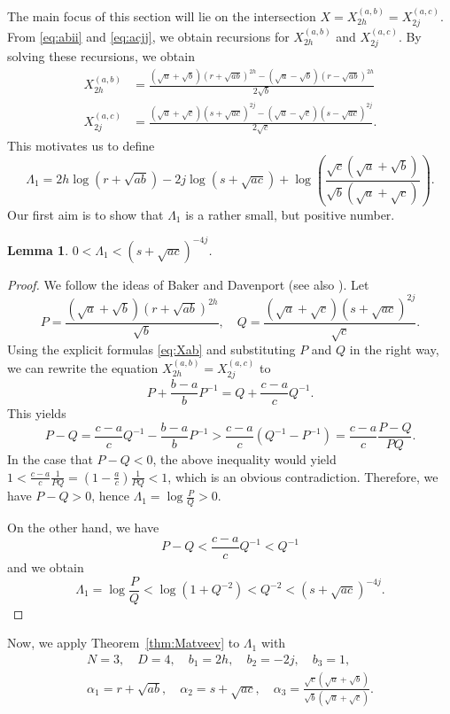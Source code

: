 \documentclass{amsart}
\newtheorem{lemma}{Lemma}
\theoremstyle{definition}
\begin{document}
The main focus of this section will lie on the intersection $X=X^{(a,b)}_{2h} = X^{(a,c)}_{2j}$. From \eqref{eq:abii} and \eqref{eq:acjj},
we obtain recursions for $X^{(a,b)}_{2h}$ and $X^{(a,c)}_{2j}$. By solving these recursions, we obtain
\begin{equation} \label{eq:Xab}
\begin{split}
X^{(a,b)}_{2h}& = \frac{(\sqrt{a} + \sqrt{b})(r+\sqrt{ab})^{2h}-(\sqrt{a} - \sqrt{b})(r-\sqrt{ab})^{2h}}{2\sqrt{b}}\\
X^{(a,c)}_{2j}& = \frac{ ( \sqrt{a} + \sqrt{c})(s+\sqrt{ac})^{2j}-  ( \sqrt{a} - \sqrt{c})(s-\sqrt{ac})^{2j}}{2\sqrt{c}}.
\end{split}
\end{equation}
This motivates us to define
\begin{equation}\label{eq:Lamb1}
\Lambda_1 = 2h \log(r+\sqrt{ab})- 2j \log(s+\sqrt{ac}) + \log \left(\frac{\sqrt{c}(\sqrt{a}+\sqrt{b})}{\sqrt{b}(\sqrt{a}+\sqrt{c})}\right).
\end{equation} 
Our first aim is to show that $\Lambda_1$ is a rather small, but positive number.

\begin{lemma}\label{lem:low-Lamb1}
$0<\Lambda_1<(s+\sqrt{ac})^{-4j}$. 
\end{lemma}

\begin{proof}
We follow the ideas of Baker and Davenport \cite{Baker-Davenport:1969} (see also \cite[Lemma 5]{Dujella:2001}).  Let 
$$
P= \frac{(\sqrt{a} + \sqrt{b})(r+\sqrt{ab})^{2h}}{\sqrt{b}},\quad Q=  \frac{ ( \sqrt{a} + \sqrt{c})(s+\sqrt{ac})^{2j}}{\sqrt{c}}.
$$
Using the explicit formulas \eqref{eq:Xab} and substituting $P$ and $Q$ in the right way, we can rewrite the equation $X^{(a,b)}_{2h} = X^{(a,c)}_{2j}$ to 
$$
P+\frac{b-a}{b}P^{-1} = Q+\frac{c-a}{c}Q^{-1}. 
$$
This yields 
$$
P-Q=\frac{c-a}{c}Q^{-1}- \frac{b-a}{b}P^{-1} >\frac{c-a}{c}(Q^{-1}- P^{-1})=\frac{c-a}c\frac{P-Q}{PQ}.
$$
In the case that $P-Q<0$, the above inequality would yield $1<\frac{c-a}c \frac{1}{PQ}=(1-\frac{a}c) \frac{1}{PQ}<1$, which is
an obvious contradiction. Therefore, we have $P-Q>0$, hence $\Lambda_1 = \log\frac{P}{Q}>0$. 

On the other hand, we have 
$$
P-Q<\frac{c-a}{c}Q^{-1}<Q^{-1}
$$
and we obtain 
$$
\Lambda_1=\log \frac{P}{Q} < \log(1+Q^{-2})<Q^{-2}<(s+\sqrt{ac})^{-4j}. 
$$
\end{proof}

Now, we apply Theorem~\ref{thm:Matveev} to $\Lambda_1$ with 
\begin{gather*}
N=3,\quad D=4,\quad  b_1=2h,\quad b_2=-2j,\quad b_3=1,\\
\alpha_1= r+\sqrt{ab},\quad  \alpha_2 = s+\sqrt{ac},\quad \alpha_3=\frac{\sqrt{c}(\sqrt{a}+\sqrt{b})}{\sqrt{b}(\sqrt{a}+\sqrt{c})}.
\end{gather*}
\end{document}
